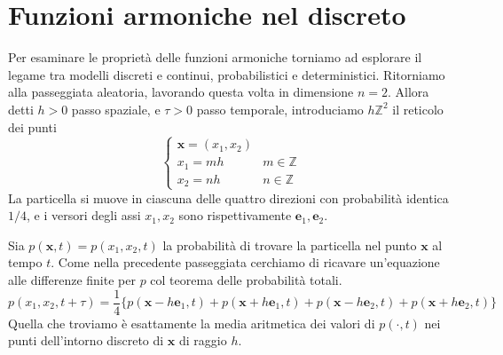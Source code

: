 \documentclass[10pt,a4paper,twoside,openright]{book}
\newcommand{\x}{\mathbf{x}}
\begin{document}
\section{Funzioni armoniche nel discreto}

Per esaminare le proprietà delle funzioni armoniche torniamo ad esplorare il legame tra modelli discreti e continui, probabilistici e deterministici. Ritorniamo alla passeggiata aleatoria, lavorando questa volta in dimensione $n=2$. Allora detti $h >0$ passo spaziale, e $\displaystyle \tau  >0$ passo temporale, introduciamo $\displaystyle h\mathbb{Z}^{2}$ il reticolo dei punti
\begin{equation*}
    \begin{cases}
        \x=(x_{1},x_{2}) &                 \\
        x_{1} =mh        & m\in \mathbb{Z} \\
        x_{2} =nh        & n\in \mathbb{Z}
    \end{cases}
\end{equation*}
La particella si muove in ciascuna delle quattro direzioni con probabilità identica $1/4$, e i versori degli assi $\displaystyle x_{1},x_{2}$ sono rispettivamente $\displaystyle \mathbf{e}_{1},\mathbf{e}_{2}$.

Sia $\displaystyle p(\x,t) =p(x_{1},x_{2},t)$ la probabilità di trovare la particella nel punto $\x$ al tempo $t$. Come nella precedente passeggiata cerchiamo di ricavare un'equazione alle differenze finite per $p$ col teorema delle probabilità totali.
\begin{equation*}
    p(x_{1},x_{2},t+\tau) =\frac{1}{4}\{p(\x-h\mathbf{e}_{1},t) +p(\x+h\mathbf{e}_{1},t) +p(\x-h\mathbf{e}_{2},t) +p(\x+h\mathbf{e}_{2},t)\}
\end{equation*}
Quella che troviamo è esattamente la media aritmetica dei valori di $p(\cdotp,t)$ nei punti dell'intorno discreto di $\x$ di raggio $h$.
\end{document}
